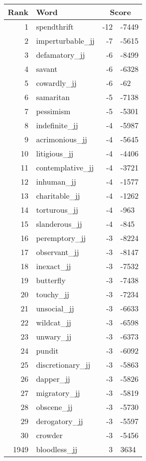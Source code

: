 \begin{longtable}[!htbp]{| rlr@{.}l |}
    \hline
    \textbf{Rank} & \textbf{Word} & \multicolumn{2}{c|}{\textbf{Score}} \\
    \hline
    \endhead
    1 & spendthrift & -12 & -7449 \\
    2 & imperturbable\_jj & -7 & -5615 \\
    3 & defamatory\_jj & -6 & -8499 \\
    4 & savant & -6 & -6328 \\
    5 & cowardly\_jj & -6 & -62 \\
    6 & samaritan & -5 & -7138 \\
    7 & pessimism & -5 & -5301 \\
    8 & indefinite\_jj & -4 & -5987 \\
    9 & acrimonious\_jj & -4 & -5645 \\
    10 & litigious\_jj & -4 & -4406 \\
    11 & contemplative\_jj & -4 & -3721 \\
    12 & inhuman\_jj & -4 & -1577 \\
    13 & charitable\_jj & -4 & -1262 \\
    14 & torturous\_jj & -4 & -963 \\
    15 & slanderous\_jj & -4 & -845 \\
    16 & peremptory\_jj & -3 & -8224 \\
    17 & observant\_jj & -3 & -8147 \\
    18 & inexact\_jj & -3 & -7532 \\
    19 & butterfly & -3 & -7438 \\
    20 & touchy\_jj & -3 & -7234 \\
    21 & unsocial\_jj & -3 & -6633 \\
    22 & wildcat\_jj & -3 & -6598 \\
    23 & unwary\_jj & -3 & -6373 \\
    24 & pundit & -3 & -6092 \\
    25 & discretionary\_jj & -3 & -5863 \\
    26 & dapper\_jj & -3 & -5826 \\
    27 & migratory\_jj & -3 & -5819 \\
    28 & obscene\_jj & -3 & -5730 \\
    29 & derogatory\_jj & -3 & -5597 \\
    30 & crowder & -3 & -5456 \\
    1949 & bloodless\_jj & 3 & 3634 \\

\end{longtable}
